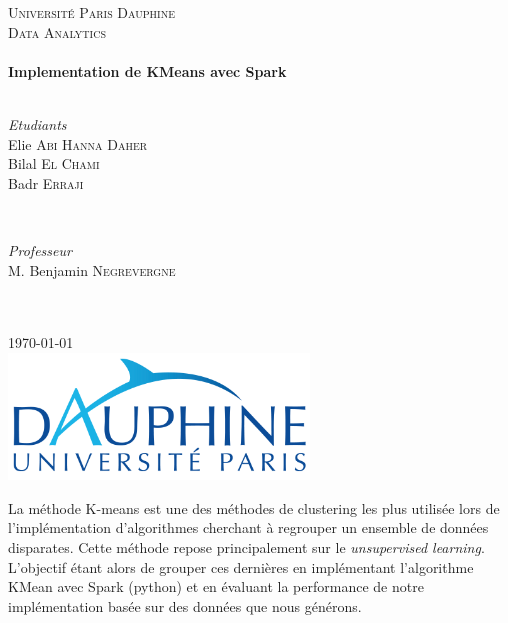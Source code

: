 \documentclass[french]{article}
\begin{document}
\begin{titlepage}
\SetDate[29/04/2018]
\newcommand{\HRule}{\rule{\linewidth}{0.5mm}}
\center 
\textsc{\LARGE Université Paris Dauphine}\\[1.5cm] 
\textsc{\Large Data Analytics}\\[0.5cm]
\HRule \\[0.4cm] { \huge \bfseries
Implementation de KMeans avec Spark}\\[0.4cm] \HRule \\[1.5cm]
\begin{minipage}{0.4\textwidth}
	\begin{flushleft} \large
		\emph{Etudiants}
		\\ Elie \textsc{Abi Hanna Daher}
		\\ Bilal \textsc{El Chami}
		\\ Badr \textsc{Erraji}
	\end{flushleft}
\end{minipage}
~
\begin{minipage}{0.4\textwidth}
	\begin{flushright} \large
		\emph{Professeur} 
		\\ M. Benjamin \textsc{Negrevergne}
		\\  \hspace{1cm}
		\\  \hspace{1cm}
	\end{flushright}
\end{minipage}\\[2cm]
{\large \today}\\[2cm]
\includegraphics[width=8cm]{img/dauphine.png}
\vfill
\end{titlepage}
 
\tableofcontents 
\newpage
La méthode K-means est une des méthodes de clustering les plus utilisée lors de l’implémentation d’algorithmes cherchant à regrouper un ensemble de données disparates. Cette méthode repose principalement sur le \textit{unsupervised learning}.
L’objectif étant alors de grouper ces dernières en implémentant l'algorithme KMean avec Spark (python) et en évaluant la performance de notre implémentation basée sur des données que nous générons.
\end{document}
